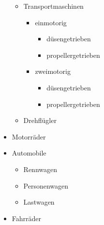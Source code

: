 \begin{Example}
\begin{ShowOutput}[\baselineskip]
\begin{itemize}
\begin{itemize}
          \item Transportmaschinen
            \begin{itemize}
            \item einmotorig
              \begin{itemize}
              \item{düsengetrieben}
              \item{propellergetrieben}
              \end{itemize}
            \item zweimotorig
              \begin{itemize}
              \item{düsengetrieben}
              \item{propellergetrieben}
              \end{itemize}
            \end{itemize}
          \item Drehflügler
          \end{itemize}
        \item Motorräder
        \item Automobile
          \begin{itemize}
          \item Rennwagen
          \item Personenwagen
          \item Lastwagen
          \end{itemize}
        \item Fahrräder
        \end{itemize}
      \end{ShowOutput}
    \end{Example}%
  \fi
  \EndIndexGroup


